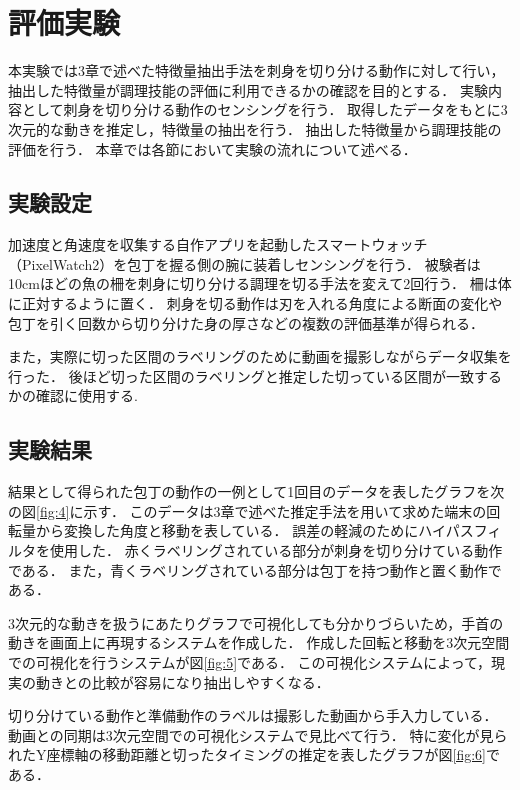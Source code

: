 \section{評価実験}
本実験では3章で述べた特徴量抽出手法を刺身を切り分ける動作に対して行い，抽出した特徴量が調理技能の評価に利用できるかの確認を目的とする．
実験内容として刺身を切り分ける動作のセンシングを行う．
取得したデータをもとに3次元的な動きを推定し，特徴量の抽出を行う．
抽出した特徴量から調理技能の評価を行う．
本章では各節において実験の流れについて述べる．
\subsection{実験設定}
加速度と角速度を収集する自作アプリを起動したスマートウォッチ（PixelWatch2）を包丁を握る側の腕に装着しセンシングを行う．
被験者は10cmほどの魚の柵を刺身に切り分ける調理を切る手法を変えて2回行う．
柵は体に正対するように置く．
刺身を切る動作は刃を入れる角度による断面の変化や包丁を引く回数から切り分けた身の厚さなどの複数の評価基準が得られる．

また，実際に切った区間のラベリングのために動画を撮影しながらデータ収集を行った．
後ほど切った区間のラベリングと推定した切っている区間が一致するかの確認に使用する.
\subsection{実験結果}
結果として得られた包丁の動作の一例として1回目のデータを表したグラフを次の図\ref{fig:4}に示す．
このデータは3章で述べた推定手法を用いて求めた端末の回転量から変換した角度と移動を表している．
誤差の軽減のためにハイパスフィルタを使用した．
赤くラベリングされている部分が刺身を切り分けている動作である．
また，青くラベリングされている部分は包丁を持つ動作と置く動作である．

3次元的な動きを扱うにあたりグラフで可視化しても分かりづらいため，手首の動きを画面上に再現するシステムを作成した．
作成した回転と移動を3次元空間での可視化を行うシステムが図\ref{fig:5}である．
この可視化システムによって，現実の動きとの比較が容易になり抽出しやすくなる．

切り分けている動作と準備動作のラベルは撮影した動画から手入力している．
動画との同期は3次元空間での可視化システムで見比べて行う．
特に変化が見られたY座標軸の移動距離と切ったタイミングの推定を表したグラフが図\ref{fig:6}である．


